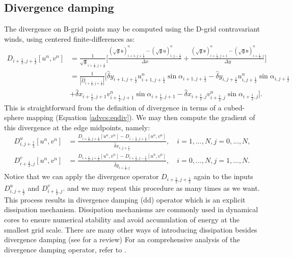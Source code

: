 \subsection{Divergence damping}
\label{dd-cs}
The divergence on B-grid points may be computed using the D-grid contravariant winds, using centered finite-differences as:
\begin{align*}
	\label{2d-sw-divdamp}
	D_{i+\frac{1}{2},j+\frac{1}{2}}[u^n,v^n] &=
	\frac{1}{\sqrt{\mathfrak{g}}_{i+\frac{1}{2},j+\frac{1}{2}}}\bigg[
	\frac{(\sqrt{\mathfrak{g}}\mathfrak{u})_{i+1,j+\frac{1}{2}}^n-(\sqrt{\mathfrak{g}}\mathfrak{u})_{i,j-\frac{1}{2}}^n}{\Delta x}+
	\frac{(\sqrt{\mathfrak{g}}\mathfrak{v})_{i+\frac{1}{2},j+1}^n-(\sqrt{\mathfrak{g}}\mathfrak{v})_{i+\frac{1}{2},j}^n}{\Delta y}
	\bigg]\nonumber\\
	&= 
	\frac{1}{|\hat{\Omega}_{i+\frac{1}{2},j+\frac{1}{2}}|}\bigg[
	{\hat{\delta}y_{i+1,j+\frac{1}{2}}{u}_{i+1,j+\frac{1}{2}}^n\sin{\alpha}_{i+1,j+\frac{1}{2}}-
	 \hat{\delta}y_{i  ,j+\frac{1}{2}}{u}_{i  ,j+\frac{1}{2}}^n\sin{\alpha}_{i  ,j+\frac{1}{2}}}\\
	&+{\hat{\delta}x_{i+\frac{1}{2},j+1}{v}_{i+\frac{1}{2},j+1}^n\sin{\alpha}_{i+\frac{1}{2},j+1}-
 	   \hat{\delta}x_{i+\frac{1}{2},j  }{v}_{i+\frac{1}{2},j  }^n\sin{\alpha}_{i+\frac{1}{2},j  }}
	\bigg].
\end{align*}
This is straightforward from the definition of divergence in terms of a cubed-sphere mapping (Equation \eqref{advcs:eqdiv}).
We may then compute the gradient of this divergence at the edge midpoints, namely:
\begin{align}
	D^u_{i,j+\frac{1}{2}}[u^n,v^n] &= \frac{D_{i+\frac{1}{2},j+\frac{1}{2}}[u^n,v^n]- D_{i-\frac{1}{2},j+\frac{1}{2}}[u^n,v^n]}{\hat{\delta}x_{i,j+\frac{1}{2}}},
	\quad i=1,\ldots,N, j=0,\ldots,N,\\
	D^v_{i+\frac{1}{2},j}[u^n,v^n] &= \frac{D_{i+\frac{1}{2},j+\frac{1}{2}}[u^n,v^n]- D_{i+\frac{1}{2},j-\frac{1}{2}}[u^n,v^n]}{\hat{\delta}y_{i+\frac{1}{2},j}},
	\quad i=0,\ldots,N, j=1,\ldots,N.
\end{align}
Notice that we can apply the divergence operator $D_{i+\frac{1}{2},j+\frac{1}{2}}$
again to the inputs $D^u_{i,j+\frac{1}{2}}$ and $D^v_{i+\frac{1}{2},j}$.
and we may repeat this procedure as many times as we want.
This process results in divergence damping (dd) operator which is an explicit dissipation mechanism.
Dissipation mechanisms are commonly used in dynamical cores to ensure numerical stability and avoid accumulation of energy at the smallest grid scale.
There are many other ways of introducing dissipation besides divergence damping (see \citet{jablonowski:2011} for a review)
For an comprehensive analysis of the divergence damping operator, refer to \citet{whitehead:2011}. 

